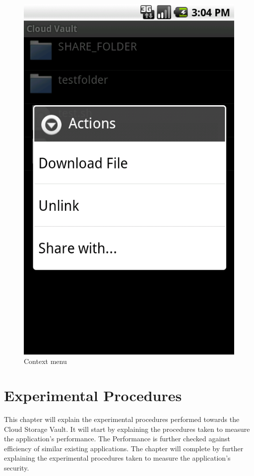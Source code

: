 \documentclass[pdftex,english,10pt,b5paper,twoside]{book}
\begin{document}
\begin{figure}[h!]
    \centering
    \includegraphics[scale=0.4]{client-browsecontext.png}
    \caption{Context menu}
    \label{fig:CSVAndroid:remotecontext}
\end{figure}

\chapter{Experimental Procedures}
This chapter will explain the experimental procedures performed towards the Cloud
Storage Vault. It will start by explaining the
procedures taken to measure the application's performance. The Performance is
further checked against efficiency of similar existing applications.
The chapter will complete by further explaining the experimental procedures
taken to measure the application's security.
\end{document}
